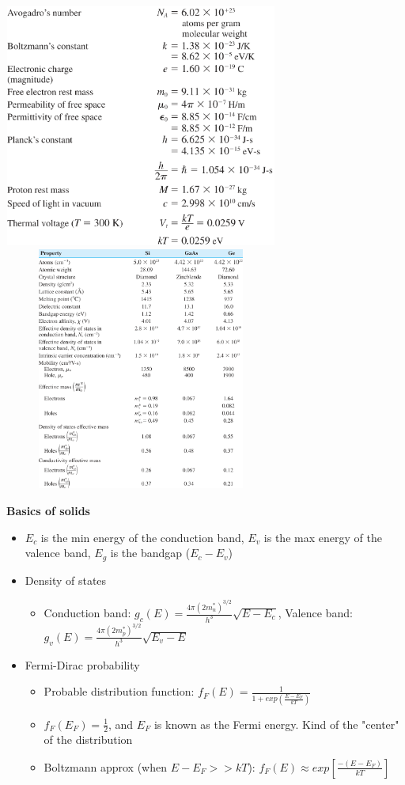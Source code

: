 \documentclass{article}
\begin{document}
\begin{center}
    \includegraphics[align=c, height=8cm, width=9cm]{consts.png}
    \includegraphics[align=c, height=8cm, width=9cm]{props.png}
\end{center}
\textbf{Basics of solids}
\begin{itemize}
    \item $E_c$ is the min energy of the conduction band, $E_v$ is the max energy of the valence band, $E_g$ is the bandgap ($E_c - E_v$)
    \item Density of states
    \begin{itemize}
        \item Conduction band: $g_c(E) = \frac{4 \pi (2m_n^*)^{3/2}}{h^3} \sqrt{E - E_c}$, Valence band: $g_v(E) = \frac{4 \pi (2m_p^*)^{3/2}}{h^3} \sqrt{E_v - E}$
    \end{itemize}
    \item Fermi-Dirac probability
    \begin{itemize}
        \item Probable distribution function: $f_F(E) = \frac{1}{1 + exp\left(\frac{E - E_F}{kT}\right)}$
        \item $f_F(E_F) = \frac{1}{2}$, and $E_F$ is known as the Fermi energy. Kind of the "center" of the distribution
        \item Boltzmann approx (when $E - E_F >> kT$): $f_F(E) \approx exp\left[\frac{-(E - E_F)}{kT}\right]$
    \end{itemize}
\end{itemize}
\end{document}
